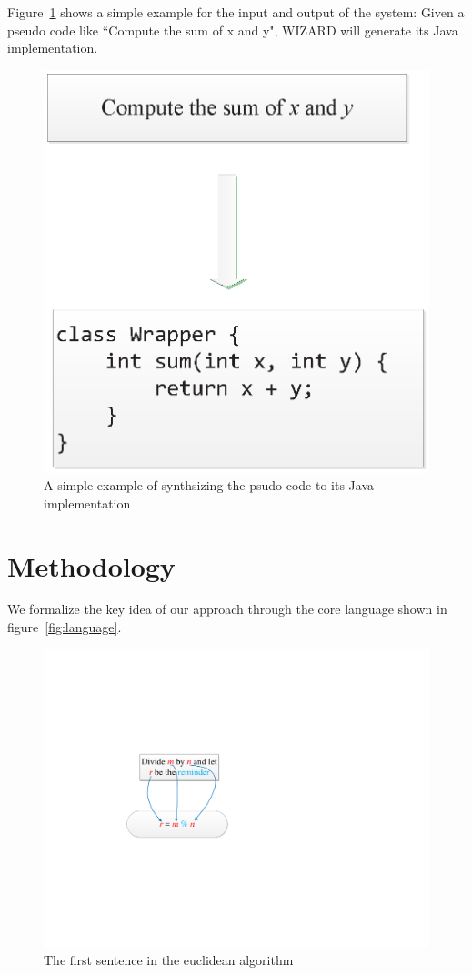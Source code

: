 \documentclass[11pt]{article}
\begin{document}
 Figure~\ref{fig:convert} shows a 
 simple example for the input and output of the system: Given a pseudo code like 
 ``Compute the sum of x and y", WIZARD will generate its Java implementation.

  
\begin{figure}
\centering
\includegraphics[scale=0.5]{figure1.eps}
\caption{A simple example of synthsizing the psudo code to its Java implementation}\label{fig:convert}
\end{figure}


\section{Methodology}
We formalize the key idea of our approach through the core language shown in
figure~\ref{fig:language}. 
 
 \begin{figure}
\centering
\includegraphics[scale=0.7]{figure2.pdf}
\caption{The first sentence in the euclidean algorithm}\label{fig:align}
\end{figure}
\end{document}
